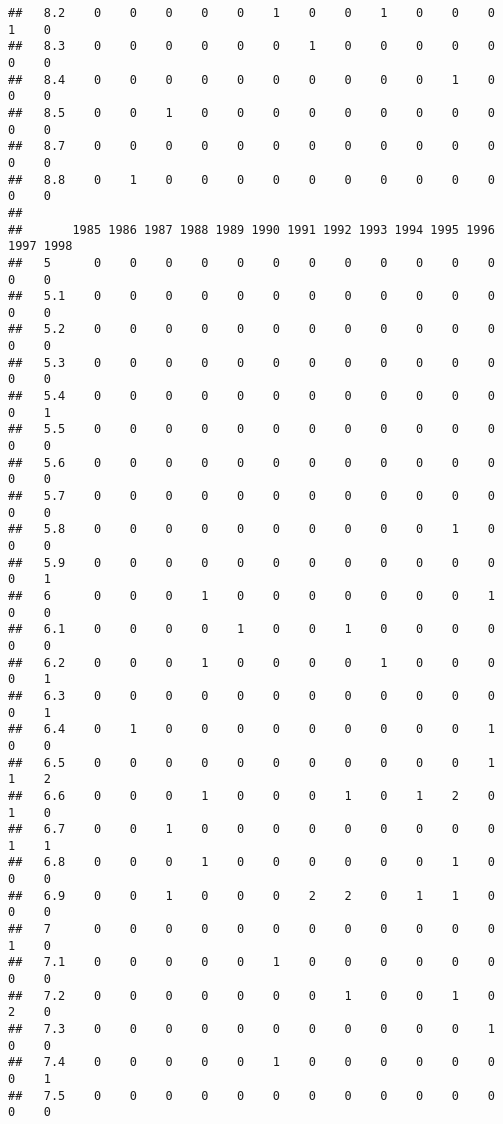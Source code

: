 \documentclass[
]{article}
\begin{document}
\begin{verbatim}
##   8.2    0    0    0    0    0    1    0    0    1    0    0    0    1    0
##   8.3    0    0    0    0    0    0    1    0    0    0    0    0    0    0
##   8.4    0    0    0    0    0    0    0    0    0    0    1    0    0    0
##   8.5    0    0    1    0    0    0    0    0    0    0    0    0    0    0
##   8.7    0    0    0    0    0    0    0    0    0    0    0    0    0    0
##   8.8    0    1    0    0    0    0    0    0    0    0    0    0    0    0
##      
##       1985 1986 1987 1988 1989 1990 1991 1992 1993 1994 1995 1996 1997 1998
##   5      0    0    0    0    0    0    0    0    0    0    0    0    0    0
##   5.1    0    0    0    0    0    0    0    0    0    0    0    0    0    0
##   5.2    0    0    0    0    0    0    0    0    0    0    0    0    0    0
##   5.3    0    0    0    0    0    0    0    0    0    0    0    0    0    0
##   5.4    0    0    0    0    0    0    0    0    0    0    0    0    0    1
##   5.5    0    0    0    0    0    0    0    0    0    0    0    0    0    0
##   5.6    0    0    0    0    0    0    0    0    0    0    0    0    0    0
##   5.7    0    0    0    0    0    0    0    0    0    0    0    0    0    0
##   5.8    0    0    0    0    0    0    0    0    0    0    1    0    0    0
##   5.9    0    0    0    0    0    0    0    0    0    0    0    0    0    1
##   6      0    0    0    1    0    0    0    0    0    0    0    1    0    0
##   6.1    0    0    0    0    1    0    0    1    0    0    0    0    0    0
##   6.2    0    0    0    1    0    0    0    0    1    0    0    0    0    1
##   6.3    0    0    0    0    0    0    0    0    0    0    0    0    0    1
##   6.4    0    1    0    0    0    0    0    0    0    0    0    1    0    0
##   6.5    0    0    0    0    0    0    0    0    0    0    0    1    1    2
##   6.6    0    0    0    1    0    0    0    1    0    1    2    0    1    0
##   6.7    0    0    1    0    0    0    0    0    0    0    0    0    1    1
##   6.8    0    0    0    1    0    0    0    0    0    0    1    0    0    0
##   6.9    0    0    1    0    0    0    2    2    0    1    1    0    0    0
##   7      0    0    0    0    0    0    0    0    0    0    0    0    1    0
##   7.1    0    0    0    0    0    1    0    0    0    0    0    0    0    0
##   7.2    0    0    0    0    0    0    0    1    0    0    1    0    2    0
##   7.3    0    0    0    0    0    0    0    0    0    0    0    1    0    0
##   7.4    0    0    0    0    0    1    0    0    0    0    0    0    0    1
##   7.5    0    0    0    0    0    0    0    0    0    0    0    0    0    0

\end{verbatim}
\end{document}
